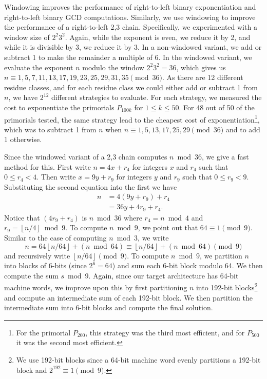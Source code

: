 \documentclass{ucalgthes1}
\theoremstyle{definition}
\newcommand{\floor}[1]{\left\lfloor #1 \right\rfloor}
\begin{document}
Windowing improves the performance of right-to-left binary exponentiation and right-to-left binary GCD computations.  Similarly, we use windowing to improve the performance of a right-to-left 2,3 chain.  Specifically, we experimented with a window size of $2^2 3^2$.  Again, while the exponent is even, we reduce it by 2, and while it is divisible by 3, we reduce it by 3.  In a non-windowed variant, we add or subtract 1 to make the remainder a multiple of 6.  In the windowed variant, we evaluate the exponent $n$ modulo the window $2^2 3^2 = 36$, which gives us $n \equiv 1, 5, 7, 11, 13, 17, 19, 23, 25, 29, 31, 35 \pmod {36}$.  As there are 12 different residue classes, and for each residue class we could either add or subtract 1 from $n$, we have $2^{12}$ different strategies to evaluate.  For each strategy, we measured the cost to exponentiate the primorials $P_{100k}$ for $1 \le k \le 50$. For 48 out of 50 of the primorials tested, the same strategy lead to the cheapest cost of exponentiation\footnote{For the primorial $P_{200}$, this strategy was the third most efficient, and for $P_{500}$ it was the second most efficient.}, which was to subtract 1 from $n$ when $n \equiv 1, 5, 13, 17, 25, 29 \pmod{36}$ and to add 1 otherwise.

Since the windowed variant of a 2,3 chain computes $n \bmod 36$, we give a fast method for this.  First write $n = 4x + r_4$ for integers $x$ and $r_4$ such that $0 \le r_4 < 4$.  Then write $x = 9y + r_9$ for integers $y$ and $r_9$ such that $0 \le r_9 < 9$.  Substituting the second equation into the first we have
\begin{align*}
	n &= 4(9y + r_9) + r_4 \\
	  &= 36y + 4r_9 + r_4.
\end{align*}
Notice that $(4r_9 + r_4)$ is $n \bmod {36}$ where $r_4 = n \bmod 4$ and $r_9 = \floor{n/4} \bmod 9$. To compute $n \bmod 9$, we point out that $64 \equiv 1 \pmod 9$.  Similar to the case of computing $n \bmod 3$, we write
\[
	n = 64 \floor{n/64} + (n \bmod 64) \equiv \floor{n/64} + (n \bmod 64) \pmod 9
\]
and recursively write $\floor{n/64} \pmod 9$.  To compute $n \bmod 9$, we partition $n$ into blocks of 6-bits (since $2^6 = 64$) and sum each 6-bit block modulo 64.  We then compute the sum $s \bmod 9$.  Again, since our target architecture has 64-bit machine words, we improve upon this by first partitioning $n$ into 192-bit blocks\footnote{We use 192-bit blocks since a 64-bit machine word evenly partitions a 192-bit block and $2^{192} \equiv 1 \pmod 9$.} and compute an intermediate sum of each 192-bit block.  We then partition the intermediate sum into 6-bit blocks and compute the final solution.
\end{document}
